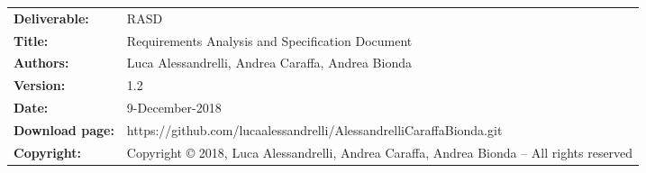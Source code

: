 \begin{table}[h!]
\begin{tabu} to \textwidth { X[0.3,r,p] X[0.7,l,p] }
\hline

\textbf{Deliverable:} & RASD\\
\textbf{Title:} & Requirements Analysis and Specification Document \\
\textbf{Authors:} & Luca Alessandrelli, Andrea Caraffa, Andrea Bionda \\
\textbf{Version:} & 1.2 \\ 
\textbf{Date:} & 9-December-2018 \\
\textbf{Download page:} & https://github.com/lucaalessandrelli/AlessandrelliCaraffaBionda.git \\
\textbf{Copyright:} & Copyright © 2018, Luca Alessandrelli, Andrea Caraffa, Andrea Bionda – All rights reserved \\
\hline
\end{tabu}
\end{table}




\setcounter{page}{2}


\newpage
{}
\tableofcontents
\newpage
{}
\listoffigures
{}
\listoftables

\clearpage
{}
\label{sect:introduction}



\clearpage
{}
\label{sect:overview}


\clearpage
{}
\label{sect:requirements}


